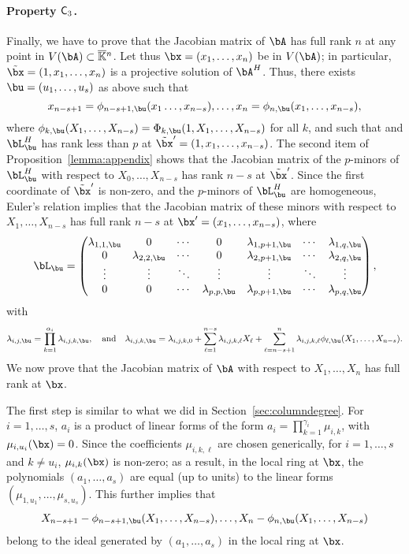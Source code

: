 \documentclass[12pt]{article}
\begin{document}
\paragraph{Property $\mathsf{C}_3$.} Finally, we have to prove that the Jacobian
matrix of $\bA$ has full rank $n$ at any point in $V(\bA) \subset
\KKbar{}^n$. Let thus $\bx=(x_1,\dots,x_n)$ be in $V(\bA)$; in
particular, $\tilde \bx=(1,x_1,\dots,x_n)$ is a projective solution of
$\bA^H$.  Thus, there exists $\bu=(u_1,\dots,u_s)$ as above such that
$$x_{n-s+1}=\phi_{n-s+1,\bu}(x_1\dots,x_{n-s}),\dots,x_{n}=\phi_{n,\bu}(x_1,\dots,x_{n-s}),$$
where $\phi_{k,\bu}(X_1,\dots,X_{n-s})=\Phi_{k,\bu}(1,X_1,\dots,X_{n-s})$ for 
all $k$, and such that
and $\bL^H_\bu$ has rank less than $p$ at $\tilde\bx'=(1,x_1,\dots,x_{n-s})$.  The second item of
Proposition~\ref{lemma:appendix} shows that the Jacobian matrix of
the $p$-minors of 
$\bL^H_\bu$ with respect to $X_0,\dots,X_{n-s}$ has rank $n-s$
at $\tilde \bx'$. Since the first coordinate of $\tilde\bx'$ is non-zero,
and the $p$-minors  of $\bL^H_\bu$ are homogeneous,
Euler's relation implies that the Jacobian matrix of 
these minors
with respect to $X_1,\dots,X_{n-s}$
has full rank $n-s$ at $\bx'=(x_1,\dots,x_{n-s})$, where  
\begin{align}\label{eqdef:Lu}
 \bL_\bu = \left( \begin{matrix}
\lambda_{1,1,\bu} & 0 & \cdots & 0 & \lambda_{1,p+1,\bu} & \cdots & \lambda_{1, q,\bu}\\
0 & \lambda_{2,2,\bu} & \cdots & 0 & \lambda_{2,p+1,\bu} & \cdots & \lambda_{2, q,\bu}\\
\vdots & \vdots & \ddots & \vdots & \vdots & \ddots & \vdots\\
0 & 0 & \cdots & \lambda_{p,p,\bu} & \lambda_{p,p+1,\bu} & \cdots & \lambda_{p, q,\bu}
\end{matrix} \right),
\end{align}
with
$$\lambda_{i,j,\bu}=\prod_{k=1}^{\alpha_i}\lambda_{i,j,k,\bu},
\quad\text{and}\quad \lambda_{i,j,k,\bu}=\lambda_{i,j,k,0}+\sum_{\ell
  = 1}^{n-s}\lambda_{i,j,k,\ell}X_\ell + \sum_{\ell =
  n-s+1}^{n}\lambda_{i,j,k,\ell}
\phi_{\ell,\bu}(X_1,\dots,X_{n-s}).$$ We now prove
that the Jacobian matrix of $\bA$ with respect to $X_1,\dots,X_n$ has
full rank at $\bx$.

The first step is similar to what we did in Section~\ref{sec:columndegree}.  For
$i=1,\dots,s$, $a_i$ is a product of linear forms of the form
$a_i=\prod_{k=1}^{\gamma_i} \mu_{i,k}$, with $\mu_{i,u_i}(\bx)=0$.
Since the coefficients $\mu_{i,k,\ell}$ are chosen generically, for
$i=1,\dots,s$ and $k \ne u_i$, $\mu_{i,k}(\bx)$ is non-zero; as a
result, in the local ring at $\bx$, the polynomials $(a_1,\dots,a_s)$
are equal (up to units) to the linear forms
$(\mu_{1,u_1},\dots,\mu_{s,u_s})$. This further implies that
\begin{align}\label{eq:subst}
X_{n-s+1}-\phi_{n-s+1,\bu}(X_1,\dots,X_{n-s}),\dots,X_{n}-\phi_{n,\bu}(X_1,\dots,X_{n-s})
\end{align}
belong to the ideal generated by $(a_1,\dots,a_s)$ in the local 
ring at $\bx$.
\end{document}

